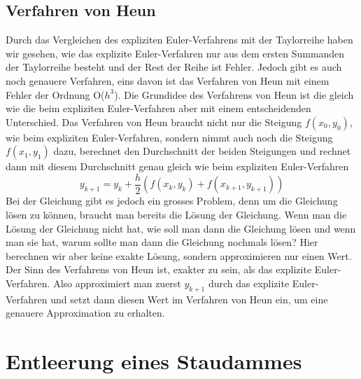 \documentclass[a4paper,12pt]{report}
\begin{document}
\section{Verfahren von Heun}\label{Heun}
Durch das Vergleichen des expliziten Euler-Verfahrens mit der Taylorreihe haben wir gesehen, wie das explizite Euler-Verfahren nur aus dem ersten Summanden der Taylorreihe besteht und der Rest der Reihe ist Fehler. Jedoch gibt es auch noch genauere Verfahren, eins davon ist das Verfahren von Heun mit einem Fehler der Ordnung O($h^3$). Die Grundidee des Verfahrens von Heun ist die gleich wie die beim expliziten Euler-Verfahren aber mit einem entscheidenden Unterschied. Das Verfahren von Heun braucht nicht nur die Steigung $f(x_0, y_0)$, wie beim expliziten Euler-Verfahren, sondern nimmt auch noch die Steigung $f(x_1, y_1)$ dazu, berechnet den Durchschnitt der beiden Steigungen und rechnet dann mit diesem Durchschnitt genau gleich wie beim expliziten Euler-Verfahren
\begin{equation*}
y_{k+1} = y_k + \frac{h}{2}(f(x_k, y_k) + f(x_{k+1}, y_{k+1}))
\end{equation*}
Bei der Gleichung gibt es jedoch ein grosses Problem, denn um die Gleichung lösen zu können, braucht man bereits die Lösung der Gleichung. Wenn man die Lösung der Gleichung nicht hat, wie soll man dann die Gleichung lösen und wenn man sie hat, warum sollte man dann die Gleichung nochmals lösen? Hier berechnen wir aber keine exakte Lösung, sondern approximieren nur einen Wert. Der Sinn des Verfahrens von Heun ist, exakter zu sein, als das explizite Euler-Verfahren. Also approximiert man zuerst $y_{k+1}$ durch das explizite Euler-Verfahren und setzt dann diesen Wert im Verfahren von Heun ein, um eine genauere Approximation zu erhalten. \cite[Schwarz S.420-424]{Schwarz}

\chapter{Entleerung eines Staudammes}\label{Staudam}
\end{document}
